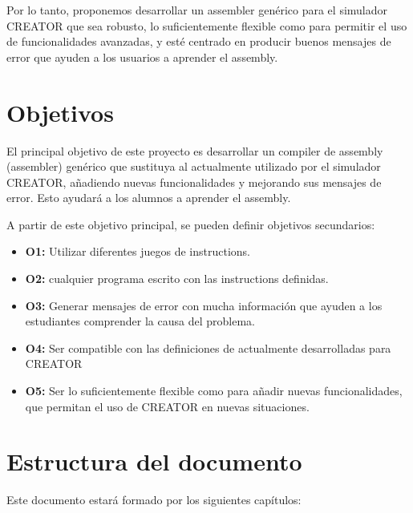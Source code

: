 
Por lo tanto, proponemos desarrollar un \gls{assembler} genérico para el simulador
CREATOR que sea robusto, lo suficientemente flexible como para permitir el uso
de funcionalidades avanzadas, y esté centrado en producir buenos mensajes de
error que ayuden a los usuarios a aprender el \gls{assembly}.

\section{Objetivos}\label{sec:objectives}

El principal objetivo de este proyecto es desarrollar un \gls{compiler} de
\gls{assembly} (\gls{assembler}) genérico que sustituya al actualmente utilizado
por el simulador CREATOR, añadiendo nuevas funcionalidades y mejorando sus
mensajes de error. Esto ayudará a los alumnos a aprender el \gls{assembly}.

\noindent
A partir de este objetivo principal, se pueden definir objetivos secundarios:

\begin{itemize}
    \item \textbf{O1:} Utilizar diferentes juegos de \glspl{instruction}.
    \item \textbf{O2:}  cualquier programa
     escrito con las \glspl{instruction}
    definidas.
    \item \textbf{O3:} Generar mensajes de error con mucha información que
    ayuden a los estudiantes comprender la causa del problema.
    \item \textbf{O4:} Ser compatible con las definiciones de
     actualmente desarrolladas para CREATOR
    \item \textbf{O5:} Ser lo suficientemente flexible como para añadir nuevas
    funcionalidades, que permitan el uso de CREATOR en nuevas situaciones.
\end{itemize}

\section{Estructura del documento}\label{sec:structure}

Este documento estará formado por los siguientes capítulos:

